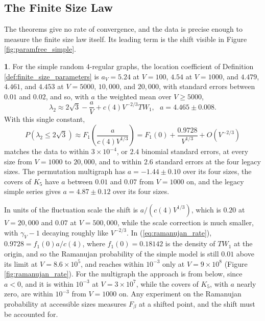 \documentclass[12pt,oneside,english]{amsart}
\numberwithin{equation}{section}
\numberwithin{figure}{section}
\numberwithin{table}{section}
\theoremstyle{plain}
\numberwithin{thm}{section}
\theoremstyle{plain}
\theoremstyle{plain}
\theoremstyle{plain}
\theoremstyle{definition}
\theoremstyle{definition}
\newtheorem{numresult}[thm]{\protect\numresultname}
\theoremstyle{definition}
\theoremstyle{remark}
\providecommand{\numresultname}{Numerical Result}
\begin{document}
\subsection{\label{subsec:finite_size}The Finite Size Law}

The theorems give no rate of convergence, and the data is precise
enough to measure the finite size law itself. Its leading term is
the shift visible in Figure \ref{fig:paramfree_simple}.
\begin{numresult}
\label{nr:finite_size}For the simple random $4$-regular graphs, the
location coefficient of Definition \ref{def:finite_size_parameters}
is $a_{V}=5.24$ at $V=100$, $4.54$ at $V=1000$, and $4.479$, $4.461$,
and $4.453$ at $V=5000$, $10{,}000$, and $20{,}000$, with standard
errors between $0.01$ and $0.02$, and so, with $a$ the weighted
mean over $V\geq5000$,
\begin{equation}
\lambda_{2}\approx2\sqrt{3}-\frac{a}{V}+c(4)V^{-2/3}TW_{1},\ \ \ a=4.465\pm0.008.\label{eq:shift_law}
\end{equation}
With this single constant,
\begin{equation}
P\left(\lambda_{2}\leq2\sqrt{3}\right)\approx F_{1}\left(\frac{a}{c(4)V^{1/3}}\right)=F_{1}(0)+\frac{0.9728}{V^{1/3}}+O\left(V^{-2/3}\right)\label{eq:ramanujan_rate}
\end{equation}
matches the data to within $3\times10^{-4}$, or $2.4$ binomial standard
errors, at every size from $V=1000$ to $20{,}000$, and to within
$2.6$ standard errors at the four legacy sizes. The permutation multigraph
has $a=-1.44\pm0.10$ over its four sizes, the covers of $K_{5}$ have
$a$ between $0.01$ and $0.07$ from $V=1000$ on, and the legacy simple
series gives $a=4.87\pm0.12$ over its four sizes.
\end{numresult}
In units of the fluctuation scale the shift is $a/(c(4)V^{1/3})$,
which is $0.20$ at $V=20{,}000$ and $0.07$ at $V=500{,}000$, while
the scale correction is much smaller, with $\gamma_{V}-1$ decaying
roughly like $V^{-2/3}$. In (\ref{eq:ramanujan_rate}), $0.9728=f_{1}(0)a/c(4)$,
where $f_{1}(0)=0.18142$ is the density of $TW_{1}$ at the origin,
and so the Ramanujan probability of the simple model is still $0.01$
above its limit at $V=8.6\times10^{5}$, and reaches within $10^{-3}$
only at $V=9\times10^{8}$ (Figure \ref{fig:ramanujan_rate}). For
the multigraph the approach is from below, since $a<0$, and it is
within $10^{-3}$ at $V=3\times10^{7}$, while the covers of $K_{5}$,
with $a$ nearly zero, are within $10^{-3}$ from $V=1000$ on. Any
experiment on the Ramanujan probability at accessible sizes measures
$F_{\beta}$ at a shifted point, and the shift must be accounted for.
\end{document}
